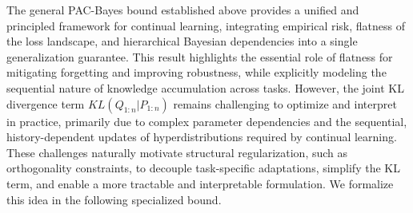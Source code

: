 \documentclass[letterpaper]{article} %
\begin{document}
The general PAC-Bayes bound established above provides a unified and principled framework for continual learning, integrating empirical risk, flatness of the loss landscape, and hierarchical Bayesian dependencies into a single generalization guarantee.   This result highlights the essential role of flatness for mitigating forgetting and improving robustness, while explicitly modeling the sequential nature of knowledge accumulation across tasks. However, the joint KL divergence term $KL(Q_{1:n}|P_{1:n})$ remains challenging to optimize and interpret in practice, primarily due to complex parameter dependencies and the sequential, history-dependent updates of hyperdistributions required by continual learning.
These challenges naturally motivate structural regularization, such as orthogonality constraints, to decouple task-specific adaptations, simplify the KL term, and enable a more tractable and interpretable formulation. We formalize this idea in the following specialized bound.








\end{document}
